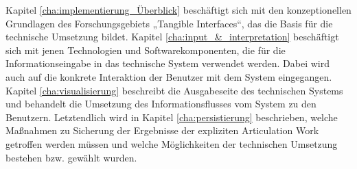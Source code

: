 Kapitel \ref{cha:implementierung_Überblick} beschäftigt sich mit den konzeptionellen Grundlagen des Forschungsgebiets „Tangible Interfaces“, das die Basis für die technische Umsetzung bildet. Kapitel \ref{cha:input_&_interpretation} beschäftigt sich mit jenen Technologien und Softwarekomponenten, die für die Informationseingabe in das technische System verwendet werden. Dabei wird auch auf die konkrete Interaktion der Benutzer mit dem System eingegangen. Kapitel \ref{cha:visualisierung} beschreibt die Ausgabeseite des technischen Systems und behandelt die Umsetzung des Informationsflusses vom System zu den Benutzern. Letztendlich wird in Kapitel \ref{cha:persistierung} beschrieben, welche Maßnahmen zu Sicherung der Ergebnisse der expliziten Articulation Work getroffen werden müssen und welche Möglichkeiten der technischen Umsetzung bestehen bzw. gewählt wurden.










